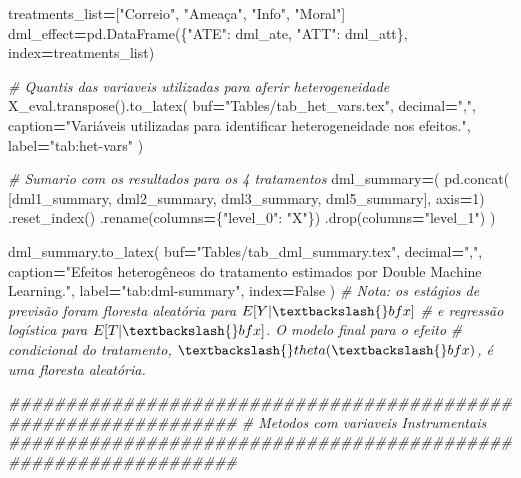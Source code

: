 \documentclass[
]{article}
\newenvironment{Shaded}{\begin{snugshade}}{\end{snugshade}}
\newcommand{\CommentTok}[1]{\textcolor[rgb]{0.56,0.35,0.01}{\textit{#1}}}
\newcommand{\DecValTok}[1]{\textcolor[rgb]{0.00,0.00,0.81}{#1}}
\newcommand{\NormalTok}[1]{#1}
\newcommand{\OperatorTok}[1]{\textcolor[rgb]{0.81,0.36,0.00}{\textbf{#1}}}
\newcommand{\StringTok}[1]{\textcolor[rgb]{0.31,0.60,0.02}{#1}}
\newcommand{\VariableTok}[1]{\textcolor[rgb]{0.00,0.00,0.00}{#1}}
\begin{document}
\begin{Shaded}
\begin{Highlighting}[]
{\NormalTok{treatments_list}\OperatorTok{=}\NormalTok{[}\StringTok{"Correio"}\NormalTok{, }\StringTok{"Ameaça"}\NormalTok{, }\StringTok{"Info"}\NormalTok{, }\StringTok{"Moral"}\NormalTok{]}
\NormalTok{dml_effect}\OperatorTok{=}\NormalTok{pd.DataFrame(\{}\StringTok{"ATE"}\NormalTok{: dml_ate, }\StringTok{"ATT"}\NormalTok{: dml_att\}, index}\OperatorTok{=}\NormalTok{treatments_list)}

\CommentTok{# Quantis das variaveis utilizadas para aferir heterogeneidade}
\NormalTok{X_eval.transpose().to_latex(}
\NormalTok{    buf}\OperatorTok{=}\StringTok{"Tables/tab_het_vars.tex"}\NormalTok{,}
\NormalTok{    decimal}\OperatorTok{=}\StringTok{","}\NormalTok{,}
\NormalTok{    caption}\OperatorTok{=}\StringTok{"Variáveis utilizadas para identificar heterogeneidade nos efeitos."}\NormalTok{,}
\NormalTok{    label}\OperatorTok{=}\StringTok{"tab:het-vars"}
\NormalTok{)}

\CommentTok{# Sumario com os resultados para os 4 tratamentos}
\NormalTok{dml_summary}\OperatorTok{=}\NormalTok{(}
\NormalTok{    pd.concat(}
\NormalTok{        [dml1_summary, dml2_summary, dml3_summary, dml5_summary],}
\NormalTok{        axis}\OperatorTok{=}\DecValTok{1}\NormalTok{)}
\NormalTok{    .reset_index()}
\NormalTok{    .rename(columns}\OperatorTok{=}\NormalTok{\{}\StringTok{"level_0"}\NormalTok{: }\StringTok{"X"}\NormalTok{\})}
\NormalTok{    .drop(columns}\OperatorTok{=}\StringTok{"level_1"}\NormalTok{)}
\NormalTok{)}

\NormalTok{dml_summary.to_latex(}
\NormalTok{    buf}\OperatorTok{=}\StringTok{"Tables/tab_dml_summary.tex"}\NormalTok{,}
\NormalTok{    decimal}\OperatorTok{=}\StringTok{","}\NormalTok{,}
\NormalTok{    caption}\OperatorTok{=}\StringTok{"Efeitos heterogêneos do tratamento estimados por Double Machine Learning."}\NormalTok{,}
\NormalTok{    label}\OperatorTok{=}\StringTok{"tab:dml-summary"}\NormalTok{,}
\NormalTok{    index}\OperatorTok{=}\VariableTok{False}
\NormalTok{)}
\CommentTok{# Nota: os estágios de previsão foram floresta aleatória para $E[Y|\textbackslash{}bfx]$}
\CommentTok{# e regressão logística para $E[T|\textbackslash{}bfx]$. O modelo final para o efeito }
\CommentTok{# condicional do tratamento, $\textbackslash{}theta(\textbackslash{}bfx)$, é uma floresta aleatória.}

\CommentTok{################################################################}
\CommentTok{# Metodos com variaveis Instrumentais}
\CommentTok{################################################################}

}
\end{Highlighting}
\end{Shaded}
\end{document}
